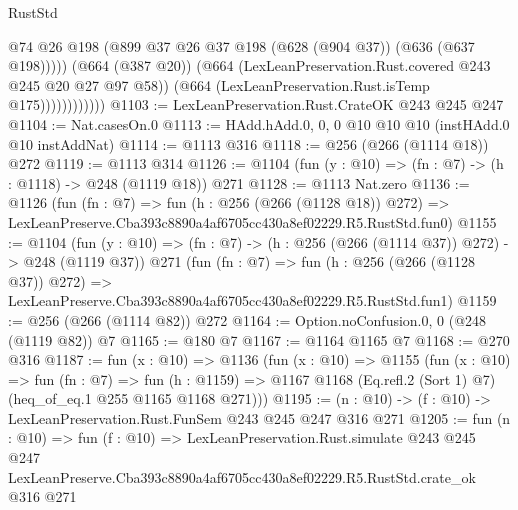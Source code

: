 \begin{lexlean}{RustStd}
\begin{coremodule}
                            @74
                            @26
                            @198
                            (@899 @37 @26 @37 @198 (@628 (@904 @37)) (@636 (@637 @198)))))
                        (@664 (@387 @20))
                        (@664 (LexLeanPreservation.Rust.covered @243 @245 @20 @27 @97 @58))
                        (@664 (LexLeanPreservation.Rust.isTemp @175))))))))))))
@1103 := LexLeanPreservation.Rust.CrateOK @243 @245 @247
@1104 := Nat.casesOn.{0}
@1113 := HAdd.hAdd.{0, 0, 0} @10 @10 @10 (instHAdd.{0} @10 instAddNat)
@1114 := @1113 @316
@1118 := @256 (@266 (@1114 @18)) @272
@1119 := @1113 @314
@1126 := @1104 (fun (y : @10) => (fn : @7) -> (h : @1118) -> @248 (@1119 @18)) @271
@1128 := @1113 Nat.zero
@1136 := @1126
    (fun (fn : @7) =>
    fun (h : @256 (@266 (@1128 @18)) @272) =>
    LexLeanPreserve.Cba393c8890a4af6705cc430a8ef02229.R5.RustStd.fun0)
@1155 := @1104
    (fun (y : @10) => (fn : @7) -> (h : @256 (@266 (@1114 @37)) @272) -> @248 (@1119 @37))
    @271
    (fun (fn : @7) =>
    fun (h : @256 (@266 (@1128 @37)) @272) =>
    LexLeanPreserve.Cba393c8890a4af6705cc430a8ef02229.R5.RustStd.fun1)
@1159 := @256 (@266 (@1114 @82)) @272
@1164 := Option.noConfusion.{0, 0} (@248 (@1119 @82)) @7
@1165 := @180 @7
@1167 := @1164 @1165 @7
@1168 := @270 @316
@1187 := fun (x : @10) =>
  @1136
    (fun (x : @10) =>
    @1155
      (fun (x : @10) =>
      fun (fn : @7) =>
      fun (h : @1159) =>
      @1167 @1168 (Eq.refl.{2} (Sort 1) @7) (heq_of_eq.{1} @255 @1165 @1168 @271)))
@1195 := (n : @10) -> (f : @10) -> LexLeanPreservation.Rust.FunSem @243 @245 @247 @316 @271
@1205 := fun (n : @10) =>
  fun (f : @10) =>
  LexLeanPreservation.Rust.simulate
    @243
    @245
    @247
    LexLeanPreserve.Cba393c8890a4af6705cc430a8ef02229.R5.RustStd.crate_ok
    @316
    @271
\end{coremodule}
\end{lexlean}
